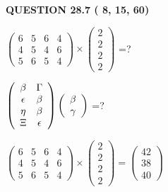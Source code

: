 \documentclass[12pt]{article}
\begin{document}
{\textbf{\Large{QUESTION
28.7 
 (          8,         15,         60)
}}}
  
  
 
$ \left( \begin{array}{ccccccccc}
           6 & 
           5 & 
           6 & 
           4 \\ 
           4 & 
           5 & 
           4 & 
           6 \\ 
           5 & 
           6 & 
           5 & 
           4
\end{array}\right) \times
\left( \begin{array}{c}
           2 \\ 
           2 \\ 
           2 \\ 
           2
\end{array}\right) $ =?
 
 
$  %
 \left( \begin{array}
 {
 c
 c
 }
 \beta & 
 \Gamma \\ 
 \epsilon & 
 \beta \\ 
 \eta & 
 \beta \\ 
                    \Xi & 
 \epsilon
 \end{array} \right)
 \left( \begin{array}
 {
 c
 }
 \beta \\ 
 \gamma
 \end{array} \right)
$ =?
 
 
 
\noindent{}
 
 

 
$\left( \begin{array}{ccccccccccccccc}
           6 & 
           5 & 
           6 & 
           4 \\ 
           4 & 
           5 & 
           4 & 
           6 \\ 
           5 & 
           6 & 
           5 & 
           4
\end{array}\right) \times
\left( \begin{array}{c}
           2 \\ 
           2 \\ 
           2 \\ 
           2
\end{array}\right)  =
\left( \begin{array}{c}
          42 \\ 
          38 \\ 
          40
\end{array}\right)  $
 
\end{document}
